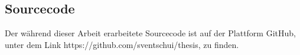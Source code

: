 \subsection{Sourcecode}

Der während dieser Arbeit erarbeitete Sourcecode ist auf der Plattform GitHub, unter dem Link https://github.com/sventschui/thesis, zu finden.
